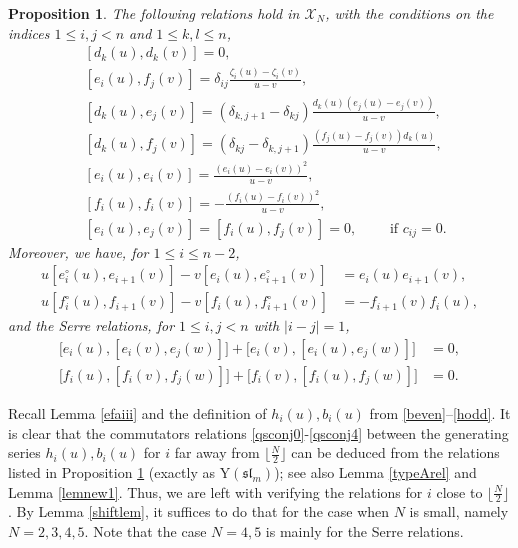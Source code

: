 \documentclass[11pt,reqno]{amsart}
\numberwithin{equation}{section}
\newtheorem{prop}[thm]{Proposition}
\theoremstyle{definition}
\theoremstyle{remark}
\newcommand{\rY}{\mathrm{Y}}
\newcommand{\lle}{\leqslant}
\newcommand{\scrX}{{\mathscr{X}}}
\begin{document}
\begin{prop}\label{propA}
The following relations hold in $\scrX_N$, with the conditions on the indices $1\lle i,j<n$ and $1\lle k,l\lle n$,
\begin{align*}
&[d_k(u),d_k(v)]=0,\\
&[e_i(u),f_j(v)]=\delta_{ij}\frac{\zeta_i(u)-\zeta_i(v)}{u-v},\\
&[d_k(u),e_j(v)]=(\delta_{k,j+1}-\delta_{kj})\frac{d_k(u)(e_j(u)-e_j(v))}{u-v},\\
&[d_k(u),f_j(v)]=(\delta_{kj}-\delta_{k,j+1})\frac{(f_j(u)-f_j(v))d_k(u)}{u-v},\\
&[e_i(u),e_i(v)]=\frac{(e_i(u)-e_i(v))^2}{u-v},\\
&[f_i(u),f_i(v)]=-\frac{(f_i(u)-f_i(v))^2}{u-v},\\
&[e_i(u),e_j(v)]=[f_i(u),f_j(v)]=0,\qquad \text{ if }c_{ij}=0.
\end{align*}
Moreover, we have, for $1\lle i\lle n-2$,
\begin{align*}
u[e_i^\circ(u),e_{i+1}(v)]-v[e_i(u),e_{i+1}^\circ(v)]&=e_i(u)e_{i+1}(v),\\
u[f_i^\circ(u),f_{i+1}(v)]-v[f_i(u),f_{i+1}^\circ(v)]&=-f_{i+1}(v)f_{i}(u),
\end{align*}
and the Serre relations, for $1\lle i,j<n$ with $|i-j|=1$,
\begin{align*}
\big[e_i(u),[e_i(v),e_j(w)]\big]+\big[e_i(v),[e_i(u),e_j(w)]\big]&=0,\\
\big[f_i(u),[f_i(v),f_j(w)]\big]+\big[f_i(v),[f_i(u),f_j(w)]\big]&=0.
\end{align*}
\end{prop}

Recall Lemma \ref{efaiii} and the definition of $h_i(u),b_i(u)$ from \eqref{beven}--\eqref{hodd}. It is clear that the commutators relations \eqref{qsconj0}-\eqref{qsconj4} between the generating series $h_i(u),b_i(u)$ for $i$ far away from $\lfloor\tfrac{N}{2}\rfloor$ can be deduced from the relations listed in Proposition \ref{propA} (exactly as $\rY(\mathfrak{sl}_m)$); see also Lemma \ref{typeArel} and Lemma \ref{lemnew1}. Thus, we are left with verifying the relations for $i$ close to $\lfloor\tfrac{N}{2}\rfloor$. By Lemma \ref{shiftlem}, it suffices to do that for the case when $N$ is small, namely $N=2,3,4,5$. Note that the case $N=4,5$ is mainly for the Serre relations.
\end{document}
